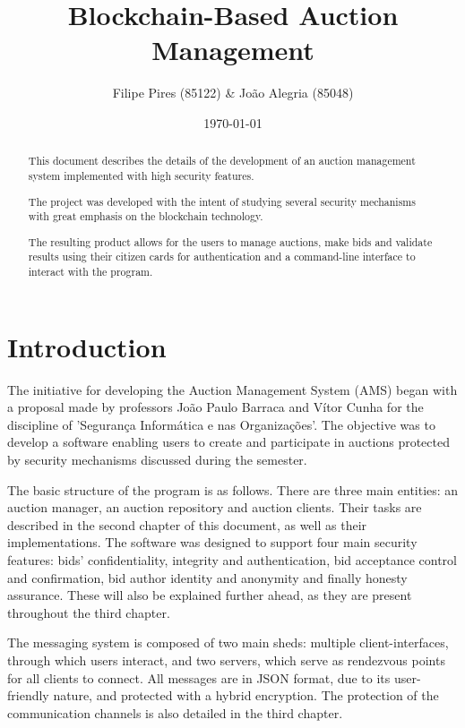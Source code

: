 \documentclass[a4paper]{article}
\title{Blockchain-Based Auction Management}
\author{Filipe Pires (85122) \& João Alegria (85048)}
\date{\today}
\begin{document}
\maketitle

\begin{abstract}
This document describes the details of the development of an auction management system implemented with high security features.

The project was developed with the intent of studying several security mechanisms with great emphasis on the blockchain technology.

The resulting product allows for the users to manage auctions, make bids and validate results using their citizen cards for authentication and a command-line interface to interact with the program.
\end{abstract}

\section{Introduction} %
\label{sec:introduction}

The initiative for developing the Auction Management System (AMS) began with a proposal made by professors João Paulo Barraca and Vítor Cunha for the discipline of 'Segurança Informática e nas Organizações'.
The objective was to develop a software enabling users to create and participate in auctions protected by security mechanisms discussed during the semester.

The basic structure of the program is as follows. 
There are three main entities: an auction manager, an auction repository and auction clients. 
Their tasks are described in the second chapter of this document, as well as their implementations.
The software was designed to support four main security features: bids’ confidentiality, integrity and authentication, bid acceptance control and confirmation, bid author identity and anonymity and finally honesty assurance. 
These will also be explained further ahead, as they are present throughout the third chapter.

The messaging system is composed of two main sheds: multiple client-interfaces, through which users interact, and two servers, which serve as rendezvous points for all clients to connect. 
All messages are in JSON format, due to its user-friendly nature, and protected with a hybrid encryption.
The protection of the communication channels is also detailed in the third chapter.
\end{document}
